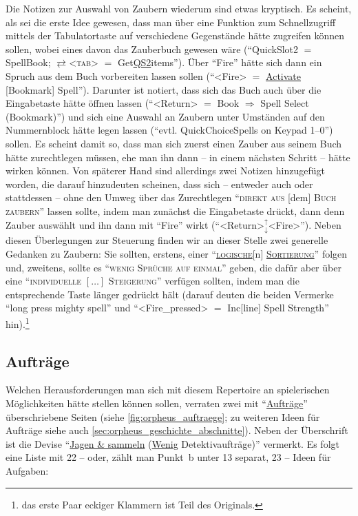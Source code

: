 \documentclass[a5paper,pagesize,numbers=noenddot]{scrbook}
\begin{document}
Die Notizen zur Auswahl von Zaubern wiederum sind etwas kryptisch.
Es scheint, als sei die erste Idee gewesen, dass man über eine Funktion zum Schnellzugriff mittels der Tabulatortaste auf verschiedene Gegenstände hätte zugreifen können sollen, wobei eines davon das Zauberbuch gewesen wäre (\enquote{QuickSlot2 $=$ SpellBook; $\rightleftarrows$<\textsc{tab}> $=$ Get\uline{QS2}items}).
Über \enquote{Fire} hätte sich dann ein Spruch aus dem Buch vorbereiten lassen sollen (\enquote{<Fire> $=$ \uline{Activate} [Bookmark] Spell}).
Darunter ist notiert, dass sich das Buch auch über die Eingabetaste hätte öffnen lassen (\enquote{<Return> $=$ Book $\Rightarrow$ Spell Select (Bookmark)}) und sich eine Auswahl an Zaubern unter Umständen auf den Nummernblock hätte legen lassen (\enquote{evtl. QuickChoiceSpells on Keypad 1--0}) sollen.
Es scheint damit so, dass man sich zuerst einen Zauber aus seinem Buch hätte zurechtlegen müssen, ehe man ihn dann -- in einem nächsten Schritt -- hätte wirken können.
Von späterer Hand sind allerdings zwei Notizen hinzugefügt worden, die darauf hinzudeuten scheinen, dass sich -- entweder auch oder stattdessen -- ohne den Umweg über das Zurechtlegen \enquote{\textsc{direkt aus} [dem] \textsc{Buch zaubern}} lassen sollte, indem man zunächst die Eingabetaste drückt, dann denn Zauber auswählt und ihn dann mit \enquote{Fire} wirkt (\enquote{<Return>$_{\downarrow}^{\uparrow}$<Fire>}).
Neben diesen Überlegungen zur Steuerung finden wir an dieser Stelle zwei generelle Gedanken zu Zaubern:
Sie sollten, erstens, einer \enquote{\textsc{\uline{logische}}[n] \textsc{\uline{Sortierung}}} folgen und, zweitens, sollte es \enquote{\textsc{wenig Sprüche auf einmal}} geben, die dafür aber über eine \enquote{\textsc{individuelle $[\dots]$ Steigerung}} verfügen sollten, indem man die entsprechende Taste länger gedrückt hält (darauf deuten die beiden Vermerke \enquote{long press mighty spell} und \enquote{<Fire\_pressed> $=$ Inc[line] Spell Strength} hin).\footnote{\autocite[S.~3;]{orpheus_interface} das erste Paar eckiger Klammern ist Teil des Originals.}


\subsection{Aufträge}\label{sec:orpheus_mechanik_auftraege}
Welchen Herausforderungen man sich mit diesem Repertoire an spielerischen Möglichkeiten hätte stellen können sollen, verraten zwei mit \enquote{\uline{Aufträge}} überschriebene Seiten (siehe \autoref{fig:orpheus_auftraege}; zu weiteren Ideen für Aufträge siehe auch \autoref{sec:orpheus_geschichte_abschnitte}).
Neben der Überschrift ist die Devise \enquote{\uline{Jagen \& sammeln} (\uline{Wenig} Detektivaufträge)} vermerkt.\autocite[S.~16]{orpheus_b_scribbles}
Es folgt eine Liste mit 22 -- oder, zählt man Punkt~b unter 13 separat, 23 -- Ideen für Aufgaben:
\end{document}
